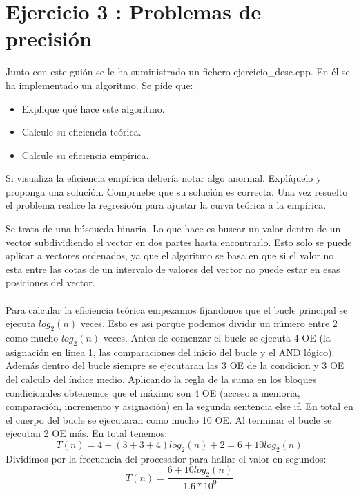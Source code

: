 \documentclass{article}
\begin{document}
\clearpage
\section{Ejercicio 3 : Problemas de precisión}
Junto con este guión se le ha suministrado un fichero ejercicio\_desc.cpp. En él se ha implementado un algoritmo. Se pide que:
\begin{itemize}
	\item Explique qué hace este algoritmo.
	\item Calcule su eficiencia teórica.
	\item Calcule su eficiencia empírica.
\end{itemize}
Si visualiza la eficiencia empírica debería notar algo anormal. Explíquelo y proponga una solución. Compruebe que su solución es correcta. Una vez resuelto el problema realice la regresioón para ajustar la curva teórica a la empírica.\\
\clearpage


	Se trata de una búsqueda binaria. Lo que hace es buscar un valor dentro de un vector subdividiendo el vector en dos partes hasta encontrarlo. Esto solo se puede aplicar a vectores ordenados, ya que el algoritmo se basa en que si el valor no esta entre las cotas de un intervalo de valores del vector no puede estar en esas posiciones del vector. \\ \\
	Para calcular la eficiencia teórica empezamos fijandonos que el bucle principal se ejecuta $log_2(n)$ veces. Esto es asi porque podemos dividir un número entre 2 como mucho  $log_2(n)$ veces. Antes de comenzar el bucle se ejecuta 4 OE (la asignación en linea 1, las comparaciones del inicio del bucle y el AND lógico). Además dentro del bucle siempre se ejecutaran las 3 OE de la condicion y 3 OE del calculo del índice medio. Aplicando la regla de la suma en los bloques condicionales obtenemos que el máximo son 4 OE (acceso a memoria, comparación, incremento y asignación) en la segunda sentencia else if. En total en el cuerpo del bucle se ejecutaran como mucho 10 OE. Al terminar el bucle se ejecutan 2 OE más.
	En total tenemos: 
	\begin{equation}
		T(n) = 4 + (3+3+4)log_2(n) + 2 = 6+ 10log_2(n)
	\end{equation} 
	Dividimos por la frecuencia del procesador para hallar el valor en segundos:
	\begin{equation}
		T(n) = \frac{6+10log_2(n)}{1.6*10^9}
	\end{equation}
	
\end{document}
